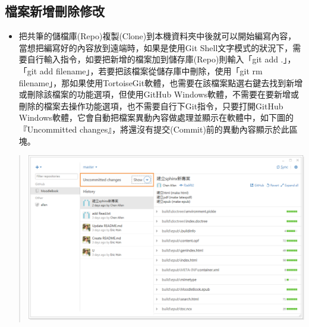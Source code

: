 \documentclass[letterpaper,10pt,english]{sphinxmanual}
\begin{document}
\subsection{檔案新增刪除修改}
\label{_doc/writing/index-github:id8}\begin{itemize}
\item {} 
把共筆的儲檔庫(Repo)複製(Clone)到本機資料夾中後就可以開始編寫內容，當想把編寫好的內容放到遠端時，如果是使用Git Shell文字模式的狀況下，需要自行輸入指令，如要把新增的檔案加到儲存庫(Repo)則輸入「git add .」，「git add filename」，若要把該檔案從儲存庫中刪除，使用「git rm filename」，那如果使用TortoiseGit軟體，也需要在該檔案點選右鍵去找到新增或刪除該檔案的功能選項，但使用GitHub Windows軟體，不需要在要新增或刪除的檔案去操作功能選項，也不需要自行下Git指令，只要打開GitHub Windows軟體，它會自動把檔案異動內容做處理並顯示在軟體中，如下圖的『Uncommitted changes』，將還沒有提交(Commit)前的異動內容顯示於此區塊。

\end{itemize}
\begin{quote}

\includegraphics{GitHub-Commit-001.png}
\end{quote}
\end{document}

